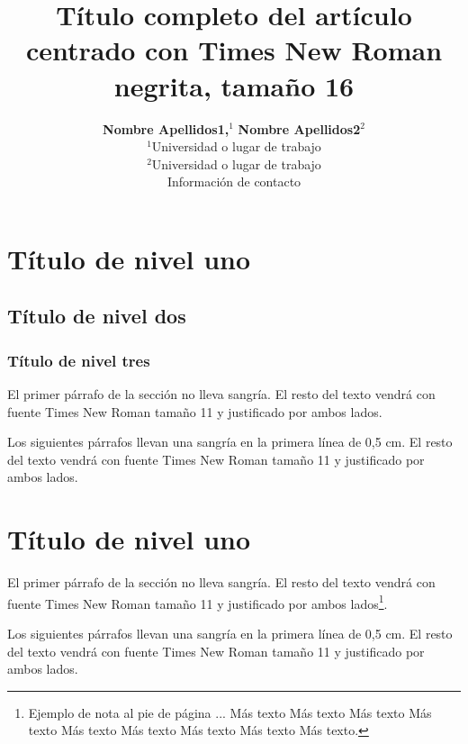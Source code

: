 \documentclass[a4paper,11pt,twocolumn,twoside]{article}
\title{Título completo del artículo centrado con Times New Roman negrita, tamaño 16}
\author {\textbf{Nombre Apellidos1,$^1$} \textbf{Nombre Apellidos2$^2$}\\
$^1$Universidad o lugar de trabajo\\
$^2$Universidad o lugar de trabajo\\
Información de contacto\\
}
\begin{document}



\label{firstpage} \maketitle

%

\section{Título de nivel uno}

\subsection{Título de nivel dos}

\subsubsection{Título de nivel tres}

El primer párrafo de la sección no lleva sangría. El resto del
texto vendrá con fuente Times New Roman tamaño 11 y justificado
por ambos lados.

Los siguientes párrafos llevan una sangría en la primera línea de
0,5 cm. El resto del texto vendrá con fuente Times New Roman
tamaño 11 y justificado por ambos lados.


\section{Título de nivel uno}

El primer párrafo de la sección no lleva sangría. El resto del
texto vendrá con fuente Times New Roman tamaño 11 y justificado
por ambos lados\footnote{Ejemplo de nota al pie de página ... Más
texto Más texto Más texto Más texto Más texto Más texto Más texto
Más texto Más texto.}.

Los siguientes párrafos llevan una sangría en la primera línea de
0,5 cm. El resto del texto vendrá con fuente Times New Roman
tamaño 11 y justificado por ambos lados.
\end{document}
